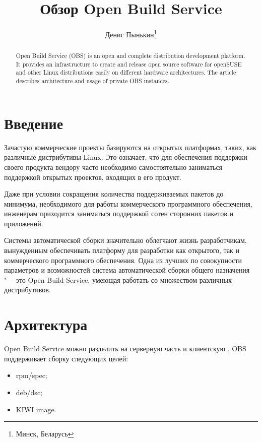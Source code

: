 \documentclass[10pt, a5paper]{article}
\begin{document}
\title{Обзор Open Build Service}%

\author{Денис Пынькин\footnote{Минск, Беларусь}}
\maketitle

\begin{abstract}
Open Build Service (OBS) is an open and complete distribution development platform. It provides an infrastructure to create and release open source software for openSUSE and other Linux distributions easily on different hardware architectures. The article describes architecture and usage of private OBS instances.
\end{abstract}

\section*{Введение}

Зачастую коммерческие проекты базируются на открытых платформах, таких, как различные дистрибутивы Linux. Это означает, что для обеспечения поддержки своего продукта  вендору часто необходимо самостоятельно заниматься поддержкой открытых проектов, входящих в его продукт.

Даже при условии сокращения количества поддерживаемых пакетов до минимума,  необходимого для работы коммерческого программного обеспечения, инженерам приходится заниматься поддержкой сотен сторонних пакетов и приложений.

Системы автоматической сборки значительно облегчают жизнь разработчикам, вынужденным обеспечивать платформу для разработки как открытого,  так и коммерческого программного обеспечения. Одна из лучших по совокупности параметров и возможностей система автоматической сборки общего назначения "--- это Open Build Service, умеющая работать со множеством различных дистрибутивов.

\section*{Архитектура}

Open Build Service можно разделить на серверную часть и клиентскую \cite{Pynkin1}.
OBS поддерживает сборку следующих целей:

\begin{itemize}
  \item rpm/spec;
  \item deb/dsc;
  \item KIWI image.
\end{itemize}
\end{document}
